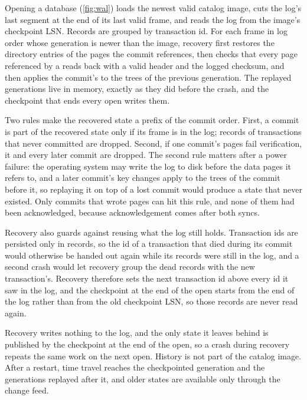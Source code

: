 Opening a database (\cref{fig:wal}) loads the newest valid catalog image, cuts the log's last segment at the end of its last valid frame, and reads the log from the image's checkpoint LSN. Records are grouped by transaction id. For each  frame in log order whose generation is newer than the image, recovery first restores the directory entries of the pages the commit references, then checks that every page referenced by a  reads back with a valid header and the logged checksum, and then applies the commit's  to the trees of the previous generation. The replayed generations live in memory, exactly as they did before the crash, and the checkpoint that ends every open writes them.

Two rules make the recovered state a prefix of the commit order. First, a commit is part of the recovered state only if its  frame is in the log; records of transactions that never committed are dropped. Second, if one commit's pages fail verification, it and every later commit are dropped. The second rule matters after a power failure: the operating system may write the log to disk before the data pages it refers to, and a later commit's key changes apply to the trees of the commit before it, so replaying it on top of a lost commit would produce a state that never existed. Only commits that wrote pages can hit this rule, and none of them had been acknowledged, because acknowledgement comes after both syncs.

Recovery also guards against reusing what the log still holds. Transaction ids are persisted only in  records, so the id of a transaction that died during its commit would otherwise be handed out again while its records were still in the log, and a second crash would let recovery group the dead records with the new transaction's. Recovery therefore sets the next transaction id above every id it saw in the log, and the checkpoint at the end of the open starts from the end of the log rather than from the old checkpoint LSN, so those records are never read again.

Recovery writes nothing to the log, and the only state it leaves behind is published by the checkpoint at the end of the open, so a crash during recovery repeats the same work on the next open. History is not part of the catalog image. After a restart, time travel reaches the checkpointed generation and the generations replayed after it, and older states are available only through the change feed.
